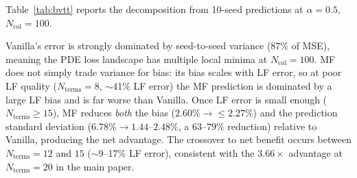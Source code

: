 \documentclass[11pt]{article}
\newcommand{\Ncol}{N_{\mathrm{col}}}
\begin{document}
Table~\ref{tab:bvtt} reports the decomposition from 10-seed predictions at $\alpha = 0.5$, $\Ncol = 100$.

\begin{table}[t]
\centering
\caption{Bias-variance decomposition at $\alpha = 0.5$, $\Ncol = 100$ (10 seeds), computed from the deposited predictions via Eq.~\eqref{eq:bvtt} ($\mathrm{Bias}$ is the relative $L^2$ error of the seed-mean prediction; $\mathrm{Std} = \sqrt{\mathrm{Var}}$; all norms are taken over the concatenated space--time evaluation vector, not averaged per timepoint). Vanilla is strongly variance-dominated (87\%). MF's bias scales with LF error: at low LF quality MF carries a large LF bias and underperforms, whereas at high LF quality ($N_{\mathrm{terms}} \geq 15$) MF reduces \emph{both} bias and standard deviation relative to Vanilla, producing the net advantage. The crossover to net benefit occurs between $N_{\mathrm{terms}} = 12$ and $15$.}
\label{tab:bvtt}
\end{table}

Vanilla's error is strongly dominated by seed-to-seed variance ($87\%$ of MSE), meaning the PDE loss landscape has multiple local minima at $\Ncol = 100$. MF does not simply trade variance for bias: its bias scales with LF error, so at poor LF quality ($N_{\mathrm{terms}} = 8$, $\sim$41\% LF error) the MF prediction is dominated by a large LF bias and is far worse than Vanilla. Once LF error is small enough ($N_{\mathrm{terms}} \geq 15$), MF reduces \emph{both} the bias ($2.60\% \to \leq 2.27\%$) and the prediction standard deviation ($6.78\% \to 1.44$--$2.48\%$, a $63$--$79\%$ reduction) relative to Vanilla, producing the net advantage. The crossover to net benefit occurs between $N_{\mathrm{terms}} = 12$ and $15$ ($\sim$9--17\% LF error), consistent with the $3.66\times$ advantage at $N_{\mathrm{terms}} = 20$ in the main paper.
\end{document}
